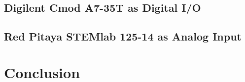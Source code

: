 \documentclass[12pt,a4paper]{report}
\begin{document}
\section{Digilent Cmod A7-35T as Digital I/O}\label{sec:2_2_digilent}


\section{Red Pitaya STEMlab 125-14 as Analog Input}\label{sec:2_3_red_pitaya}


\clearpage
\chapter*{Conclusion}\label{chap:0_3_conclusion}


\clearpage
\printbibliography[heading=bibintoc]
\end{document}
